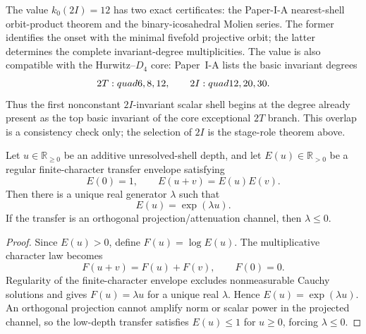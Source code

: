 \documentclass[12pt,a4paper]{article}
\begin{document}
\begin{remark}
\label{p8:rem:degree-twelve-core-compatibility}
The value \(k_0(2I)=12\) has two exact certificates: the Paper-I-A
nearest-shell orbit-product theorem and the binary-icosahedral Molien series.
The former identifies the onset with the minimal fivefold projective orbit;
the latter determines the complete invariant-degree multiplicities.  The
value is also compatible with the Hurwitz--\(D_4\) core: Paper~I-A lists the basic invariant degrees
\[
    2T:\\quad 6,8,12,
    \qquad
    2I:\\quad 12,20,30.
\]
Thus the first nonconstant \(2I\)-invariant scalar shell begins at the degree
already present as the top basic invariant of the core exceptional \(2T\)
branch.  This overlap is a consistency check only; the selection of \(2I\)
is the stage-role theorem above.
\end{remark}

\begin{lemma}
\label{p8:lem:regular-positive-character-envelope}
\leavevmode\par\noindent
Let \(u\in\mathbb R_{\ge0}\) be an additive unresolved-shell depth, and let
\(E(u)\in\mathbb R_{>0}\) be a regular finite-character transfer envelope
satisfying
\[
E(0)=1,
\qquad
E(u+v)=E(u)E(v).
\]
Then there is a unique real generator \(\lambda\) such that
\[
E(u)=\exp(\lambda u).
\]
If the transfer is an orthogonal projection/attenuation channel, then
\(\lambda\le0\).
\end{lemma}

\begin{proof}
Since \(E(u)>0\), define \(F(u)=\log E(u)\).  The multiplicative character law becomes
\[
F(u+v)=F(u)+F(v),
\qquad
F(0)=0.
\]
Regularity of the finite-character envelope excludes nonmeasurable Cauchy solutions and gives
\(F(u)=\lambda u\) for a unique real \(\lambda\).  Hence \(E(u)=\exp(\lambda u)\).  An orthogonal projection cannot amplify norm or scalar power in the projected channel, so the low-depth transfer satisfies \(E(u)\le1\) for \(u\ge0\), forcing \(\lambda\le0\).
\end{proof}
\end{document}
